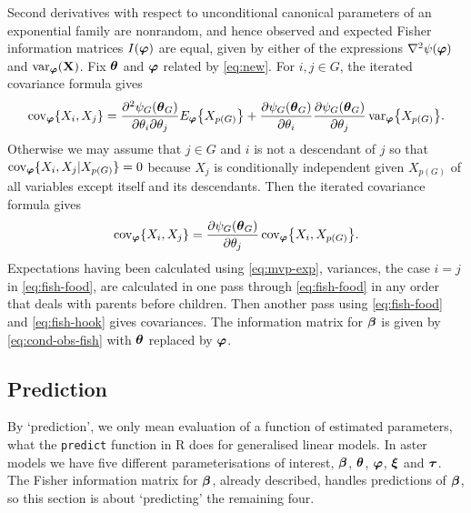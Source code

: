 Second derivatives with respect to unconditional canonical
parameters of an exponential family are nonrandom, and hence
observed and expected Fisher information matrices $I({\boldsymbol{\varphi}})$ are equal,
given by either of the
expressions $\nabla^2 \psi({\boldsymbol{\varphi}})$ and $\operatorname{var}_{\boldsymbol{\varphi}}(\mathbf{X})$.
Fix ${\boldsymbol{\theta}}$ and ${\boldsymbol{\varphi}}$ related by \eqref{eq:new}.
For $i, j \in G$, the iterated covariance formula gives
\begin{equation} \label{eq:fish-food}
   \operatorname{cov}_{\boldsymbol{\varphi}} \{ X_i, X_j \}
   =
   \frac{\partial^2 \psi_G({\boldsymbol{\theta}}_G)}{\partial \theta_i \partial \theta_j}
   E_{\boldsymbol{\varphi}} \bigl\{ X_{p(G)} \bigr\}
   +
   \frac{\partial \psi_G({\boldsymbol{\theta}}_G)}{\partial \theta_i}
   \frac{\partial \psi_G({\boldsymbol{\theta}}_G)}{\partial \theta_j}
   \operatorname{var}_{\boldsymbol{\varphi}} \bigl\{ X_{p(G)} \bigr\}.
\end{equation}
Otherwise we may assume that $j \in G$ and $i$ is not a descendant of $j$ so that
$\operatorname{cov}_{\boldsymbol{\varphi}} \{ X_i, X_j | X_{p(G)} \} = 0$
because $X_{j}$ is conditionally independent given $X_{p(G)}$ of
all variables except itself and its descendants.
Then the iterated covariance formula gives
\begin{equation} \label{eq:fish-hook}
   \operatorname{cov}_{\boldsymbol{\varphi}} \{ X_i, X_j \}
   =
   \frac{\partial \psi_G({\boldsymbol{\theta}}_G)}{\partial \theta_j}
   \operatorname{cov}_{\boldsymbol{\varphi}} \bigl\{ X_i, X_{p(G)} \bigr\}.
\end{equation}
Expectations having been calculated using \eqref{eq:mvp-exp},
variances, the case $i = j$ in \eqref{eq:fish-food}, are calculated
in one pass through \eqref{eq:fish-food} in any order that deals with parents
before children.  Then another pass using \eqref{eq:fish-food} and \eqref{eq:fish-hook} gives covariances.
The information matrix for ${\boldsymbol{\beta}}$ is given by
\eqref{eq:cond-obs-fish} with ${\boldsymbol{\theta}}$ replaced by ${\boldsymbol{\varphi}}$.

\subsection{Prediction} \label{sec:predict}

By `prediction', we only mean evaluation of a function of estimated
parameters, what the \texttt{predict} function in R does for
generalised linear models.  In aster models we have five different
parameterisations of interest, ${\boldsymbol{\beta}}$, ${\boldsymbol{\theta}}$, ${\boldsymbol{\varphi}}$,
${\boldsymbol{\xi}}$ and ${\boldsymbol{\tau}}$.  The Fisher information matrix for ${\boldsymbol{\beta}}$, already
described, handles predictions of ${\boldsymbol{\beta}}$, so
this section is about `predicting' the remaining four.

